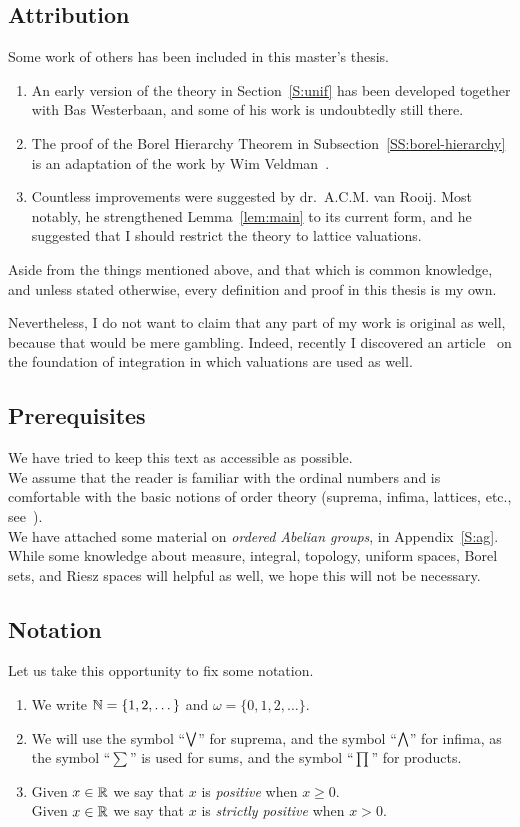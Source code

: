 \documentclass[main.tex]{subfiles}
\begin{document}
\subsection{Attribution}
Some work of others has been included in this master's thesis.
\begin{enumerate}
\item
An early version of the theory in Section~\ref{S:unif}
has been developed together with Bas Westerbaan,
and some of his work is undoubtedly still there.
\item
The proof of the Borel Hierarchy Theorem
in Subsection~\ref{SS:borel-hierarchy}
is an adaptation of the work by Wim Veldman~\cite{Veldman08}.
\item
Countless improvements 
were suggested by dr.~A.C.M. van Rooij.
Most notably,
he strengthened Lemma~\ref{lem:main}
to its current form,
and he suggested that I should restrict the theory  to
lattice valuations.
\end{enumerate}
Aside from the things mentioned above,
and that which is common knowledge,
and unless stated otherwise,
every definition and proof in this thesis is my own.

Nevertheless,
I do not want to
claim 
that any part of my work is original as well,
because that would be mere gambling.
Indeed,
recently I discovered
an article~\cite{Alfsen63}
on the foundation of integration
in which 
 valuations
are used as well.

\subsection{Prerequisites}
We have tried to keep this text as accessible as possible.\\
We assume that
the reader is familiar
with the ordinal numbers
and is comfortable with the basic notions
of order theory (suprema, infima, lattices, etc., see~\cite{DP02}).\\
We have attached some material on \emph{ordered Abelian groups},
in Appendix~\ref{S:ag}.\\
While some knowledge
about measure, integral,
topology,
uniform spaces, 
Borel sets,
and Riesz spaces will helpful as well,
we hope this will not be necessary.

\subsection{Notation}
Let us take this opportunity to fix some notation.
\begin{enumerate}
\item
We write $\mathbb{N}=\{1,2,\dotsc\}$ and $\omega=\{0,1,2,\dotsc\}$.
\item
We will use the symbol ``$\textstyle{\bigvee}$'' for suprema,
and the symbol ``$\textstyle{\bigwedge}$'' for infima,
as the symbol ``$\sum$'' is used for sums,
and the symbol ``$\prod$'' for products.
\item
Given  $x\in \mathbb{R}$ we say that $x$ is \emph{positive}
when $x \geq 0$.\\
Given  $x\in \mathbb{R}$ we say that $x$ is \emph{strictly positive}
when $x > 0$.\\
\end{enumerate}
\end{document}
